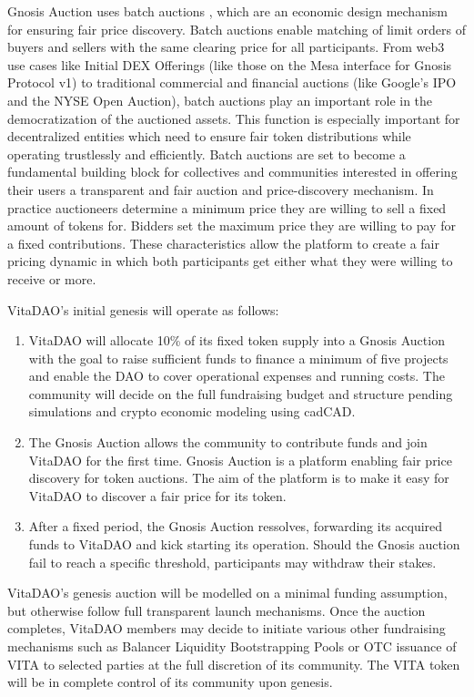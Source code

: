 \documentclass[12pt,letterpaper]{article}
\begin{document}
Gnosis Auction uses batch auctions \citep{BatchAuctions}, which are an economic design mechanism for ensuring fair price discovery. Batch auctions enable matching of limit orders of buyers and sellers with the same clearing price for all participants. From web3 use cases like Initial DEX Offerings (like those on the Mesa interface for Gnosis Protocol v1) to traditional commercial and financial auctions (like Google’s IPO and the NYSE Open Auction), batch auctions play an important role in the democratization of the auctioned assets. This function is especially important for decentralized entities which need to ensure fair token distributions while operating trustlessly and efficiently. Batch auctions are set to become a fundamental building block for collectives and communities interested in offering their users a transparent and fair auction and price-discovery mechanism. In practice auctioneers determine a minimum price they are willing to sell a fixed amount of tokens for. Bidders set the maximum price they are willing to pay for a fixed contributions. These characteristics allow the platform to create a fair pricing dynamic in which both participants get either what they were willing to receive or more.

VitaDAO’s initial genesis will operate as follows:
 
\begin{enumerate}
\item VitaDAO will allocate 10\% of its fixed token supply into a Gnosis Auction with the goal to raise sufficient funds to finance a minimum of five projects and enable the DAO to cover operational expenses and running costs. The community will decide on the full fundraising budget and structure pending simulations and crypto economic modeling using cadCAD. 
\item The Gnosis Auction allows the community to contribute funds and join VitaDAO for the first time. Gnosis Auction is a platform enabling fair price discovery for token auctions. The aim of the platform is to make it easy for VitaDAO to discover a fair price for its token. 
\item After a fixed period, the Gnosis Auction ressolves, forwarding its acquired funds to VitaDAO and kick starting its operation. Should the Gnosis auction fail to reach a specific threshold, participants may withdraw their stakes.
\end{enumerate}

VitaDAO’s genesis auction will be modelled on a minimal funding assumption, but otherwise follow full transparent launch mechanisms. Once the auction completes, VitaDAO members may decide to initiate various other fundraising mechanisms such as Balancer Liquidity Bootstrapping Pools or OTC issuance of VITA to selected parties at the full discretion of its community. The VITA token will be in complete control of its community upon genesis.
\end{document}
